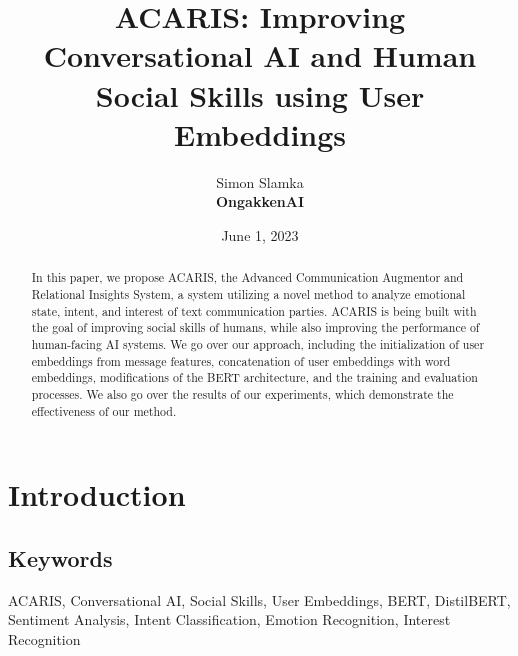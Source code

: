 \documentclass{article}
\title{ACARIS: Improving Conversational AI and Human Social Skills using User Embeddings}
\author{Simon Slamka\\
\small\textbf{OngakkenAI}}
\date{June 1, 2023}
\begin{document}
\maketitle

\begin{abstract}
In this paper, we propose ACARIS, the Advanced Communication Augmentor and Relational Insights System, a system utilizing a novel method to analyze emotional state, intent, and interest of text communication parties. ACARIS is being built with the goal of improving social skills of humans, while also improving the performance of human-facing AI systems. We go over our approach, including the initialization of user embeddings from message features, concatenation of user embeddings with word embeddings, modifications of the BERT architecture, and the training and evaluation processes. We also go over the results of our experiments, which demonstrate the effectiveness of our method.
\end{abstract}

\section{Introduction}
\subsection{Keywords}
ACARIS, Conversational AI, Social Skills, User Embeddings, BERT, DistilBERT, Sentiment Analysis, Intent Classification, Emotion Recognition, Interest Recognition
\end{document}
